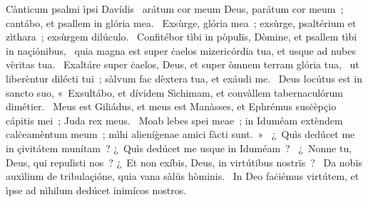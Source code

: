 { Cànticum psalmi ìpsi Davídis}
{%
~arátum cor meum Deus, parátum cor meum~; cantábo, et psallem in glória mea. 
~Exsùrge, glória mea~; exsùrge, psaltérium et zìthara~; exsùrgem dilúculo. 
~Confitébor tìbi in pòpulïs, Dòmine, et psallem tìbi in naçiónibus, 
~quia magna est super ċaelos mizericórdia tua, et usque ad nubes vèritas tua. 
~Exaltáre super ċaelos, Deus, et super òmnem terram glória tua, 
~ut liberèntur dilécti tui~; sàlvum fac dèxtera tua, et exáudi me. 
~Deus locútus est in sancto suo, «~Exsultábo, et dívidem Sìchimam, et convàllem tabernaculórum dimétier. 
~Meus est Giliádus, et meus est Manàsses, et Ephrémus susċèpçio cápitis mei~; Juda rex meus. 
~Moab lebes spei meae~; in Iduméam extèndem calċeamèntum meum~; mìhi alieníġenae amici fàcti sunt.~»
~¿~Quìs dedúcet me in çivitátem munítam~? ¿~Quìs dedúcet me usque in Iduméam~? 
~¿~Nonne tu, Deus, qui repulìsti nos~? ¿~Et non exíbis, Deus, in virtútibus nostrïs~? 
~Da nobïs auxìlium de tribulaçióne, quia vana sàlüs hòminis. 
~In Deo faċiémus virtútem, et ìpse ad nìhilum dedúcet inimícos nostros. 
}
